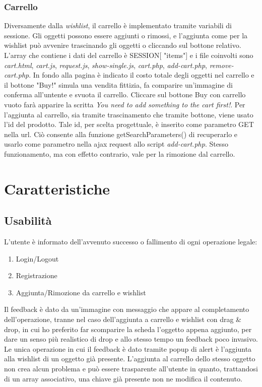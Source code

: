 \documentclass[a4paper,12pt]{article}
\begin{document}
\subsubsection{Carrello}
Diversamente dalla \textit{wishlist}, il carrello è implementato tramite variabili di sessione.
Gli oggetti possono essere aggiunti o rimossi, e l'aggiunta come per la wishlist può avvenire trascinando
gli oggetti o cliccando sul bottone relativo.
L'array che contiene i dati del carrello è \textdollar\textunderscore SESSION[ "items"] e i file coinvolti sono
\textit{cart.html}, \textit{cart.js}, \textit{request.js}, \textit{show-single.js}, \textit{cart.php}, \textit{add-cart.php}, \textit{remove-cart.php}.
In fondo alla pagina  è indicato il costo totale degli oggetti nel carrello e il bottone "Buy!" simula una
vendita fittizia, fa comparire un'immagine di conferma all'untente e svuota il carrello.
Cliccare sul bottone Buy con carrello vuoto farà apparire la scritta
\textit{You need to add something to the cart first!}.
Per l'aggiunta al carrello, sia tramite trascinamento che tramite bottone, viene usato l'id del prodotto.
Tale id, per scelta progettuale, è inserito come parametro GET  nella url. Ciò consente alla funzione
getSearchParameters() di recuperarlo e usarlo come parametro nella ajax request allo script \textit{add-cart.php}.
Stesso funzionamento, ma con effetto contrario, vale per la rimozione dal carrello.


\section{Caratteristiche}
\subsection{Usabilità}
L'utente è informato dell'avvenuto successo o fallimento di ogni operazione
legale:
\begin{enumerate}
	\item Login/Logout
	\item Registrazione
	\item Aggiunta/Rimozione da carrello e wishlist
\end{enumerate}
Il feedback è dato da un'immagine con messaggio che appare al completamento
dell'operazione, tranne nel caso dell'aggiunta a carrello e wishlist con drag \& drop,
in cui ho preferito far scomparire la scheda l'oggetto appena aggiunto,
per dare un senso più realistico di drop e allo stesso tempo un feedback poco invasivo.
Le unica operazione in cui il feedback è dato tramite popup di alert è
l'aggiunta alla wishlist di un oggetto già presente. L'aggiunta al carrello dello stesso oggetto
non crea alcun problema e può essere trasparente all'utente in quanto, trattandosi di un array associativo,
una chiave  già presente non ne modifica il contenuto.
\end{document}
